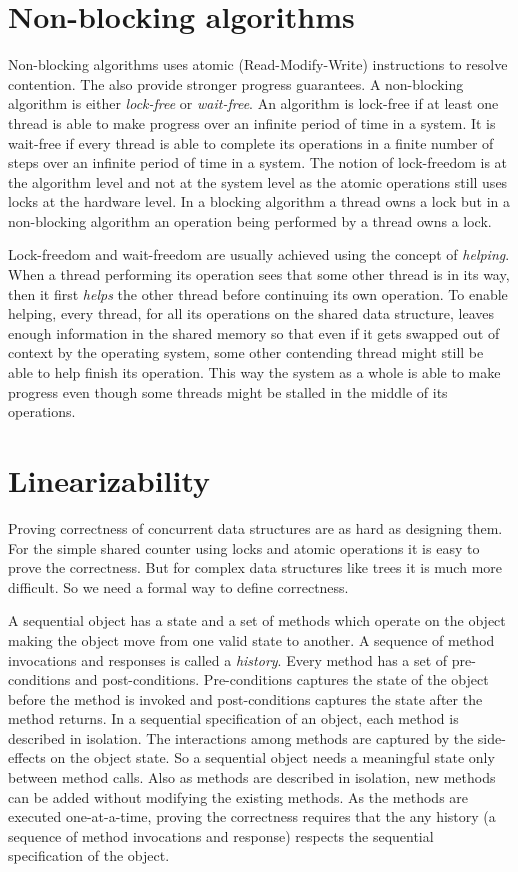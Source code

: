 \section{Non-blocking algorithms}
Non-blocking algorithms uses atomic (Read-Modify-Write) instructions to resolve contention.
The also provide stronger progress guarantees. A non-blocking algorithm is either \emph{lock-free} or \emph{wait-free}.
An algorithm is lock-free if at least one thread is able to make progress over an infinite period of time in a system.
It is wait-free if every thread is able to complete its operations in a finite number of steps over an infinite period of time in a system.
The notion of lock-freedom is at the algorithm level and not at the system level as the atomic operations still uses locks at the hardware level.
In a blocking algorithm a thread owns a lock but in a non-blocking algorithm an operation being performed by a thread owns a lock.

Lock-freedom and wait-freedom are usually achieved using the concept of \emph{helping}.
When a thread performing its operation sees that some other thread is in its way,  then it first \emph{helps} the other thread before continuing its own operation.
To enable helping, every thread, for all its operations on the shared data structure, leaves enough information in the shared memory so that even if it gets swapped out of context by the operating system, some other contending thread might still be able to help finish its operation.
This way the system as a whole is able to make progress even though some threads might be stalled in the middle of its operations.

\section{Linearizability}
Proving correctness of concurrent data structures are as hard as designing them.
For the simple shared counter using locks and atomic operations it is easy to prove the correctness.
But for complex data structures like trees it is much more difficult.
So we need a formal way to define correctness. 

A sequential object has a state and a set of methods which operate on the object making the object move from one valid state to another.
A sequence of method invocations and responses is called a \emph{history}.
Every method has a set of pre-conditions and post-conditions.
Pre-conditions captures the state of the object before the method is invoked and post-conditions captures the state after the method returns.
In a sequential specification of an object, each method is described in isolation.
The interactions among methods are captured by the side-effects on the object state.
So a sequential object needs a meaningful state only between method calls.
Also as methods are described in isolation, new methods can be added without modifying the existing methods.
As the methods are executed one-at-a-time, proving the correctness requires that the any history (a sequence of method invocations and response) respects the sequential specification of the object.

